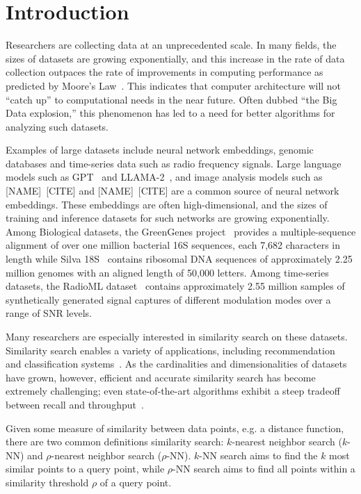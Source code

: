 \section{Introduction}
\label{sec:introduction}

Researchers are collecting data at an unprecedented scale.
In many fields, the sizes of datasets are growing exponentially, and this increase in the rate of data collection outpaces the rate of improvements in computing performance as predicted by Moore's Law~\cite{brescia2012extracting}.
This indicates that computer architecture will not ``catch up'' to computational needs in the near future.
Often dubbed ``the Big Data explosion,'' this phenomenon has led to a need for better algorithms for analyzing such datasets.

Examples of large datasets include neural network embeddings, genomic databases and time-series data such as radio frequency signals.
Large language models such as GPT~\cite{2020arXiv200514165B, OpenAI2023GPT4TR} and LLAMA-2~\cite{Touvron2023Llama2O}, and image analysis models such as {\color{red} [NAME]~[CITE] and [NAME]~[CITE]} are a common source of neural network embeddings.
These embeddings are often high-dimensional, and the sizes of training and inference datasets for such networks are growing exponentially.
Among Biological datasets, the GreenGenes project~\cite{desantis2006greengenes} provides a multiple-sequence alignment of over one million bacterial 16S sequences, each 7,682 characters in length while Silva 18S~\cite{10.1093/nar/gks1219} contains ribosomal DNA sequences of approximately 2.25 million genomes with an aligned length of 50,000 letters.
Among time-series datasets, the RadioML dataset~\cite{oshea2018radioml} contains approximately 2.55 million samples of synthetically generated signal captures of different modulation modes over a range of SNR levels.

Many researchers are especially interested in similarity search on these datasets. 
Similarity search enables a variety of applications, including recommendation~\cite{annoy} and classification systems~\cite{suyanto2022knnclassifier}. 
As the cardinalities and dimensionalities of datasets have grown, however, efficient and accurate similarity search has become extremely challenging; 
even state-of-the-art algorithms exhibit a steep tradeoff between recall and throughput~\cite{Malkov2016EfficientAR, johnson2019billion, annoy, aumuller2020ann}.

Given some measure of similarity between data points, e.g. a distance function, there are two common definitions similarity search: $k$-nearest neighbor search ($k$-NN) and $\rho$-nearest neighbor search ($\rho$-NN).
$k$-NN search aims to find the $k$ most similar points to a query point, while $\rho$-NN search aims to find all points within a similarity threshold $\rho$ of a query point.

